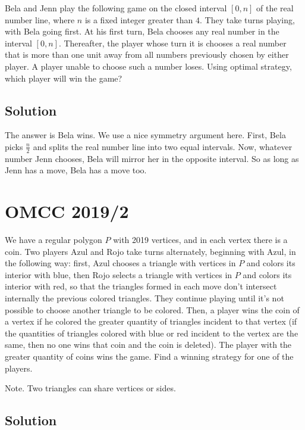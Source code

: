 \documentclass{article}
\begin{document}
Bela and Jenn play the following game on the closed interval $[0, n]$ of the real number line, where $n$ is a fixed integer greater than $4$. They take turns playing, with Bela going first. At his first turn, Bela chooses any real number in the interval $[0, n]$. Thereafter, the player whose turn it is chooses a real number that is more than one unit away from all numbers previously chosen by either player. A player unable to choose such a number loses. Using optimal strategy, which player will win the game?

\subsection{Solution}

The answer is Bela wins. We use a nice symmetry argument here. First, Bela picks $\frac{n}{2}$ and splits the real number line into two equal intervals. Now, whatever number Jenn chooses, Bela will mirror her in the opposite interval. So as long as Jenn has a move, Bela has a move too.

\pagebreak\section{OMCC 2019/2}

We have a regular polygon $P$ with 2019 vertices, and in each vertex there is a coin. Two players Azul and Rojo take turns alternately, beginning with Azul, in the following way: first, Azul chooses a triangle with vertices in $P$ and colors its interior with blue, then Rojo selects a triangle with vertices in $P$ and colors its interior with red, so that the triangles formed in each move don't intersect internally the previous colored triangles. They continue playing until it's not possible to choose another triangle to be colored. Then, a player wins the coin of a vertex if he colored the greater quantity of triangles incident to that vertex (if the quantities of triangles colored with blue or red incident to the vertex are the same, then no one wins that coin and the coin is deleted). The player with the greater quantity of coins wins the game. Find a winning strategy for one of the players.

Note. Two triangles can share vertices or sides.

\subsection{Solution}
\end{document}
